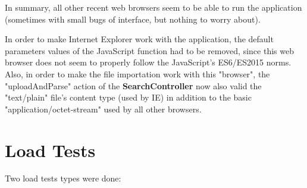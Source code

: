 \documentclass[a4paper,11pt]{report}
\begin{document}
In summary, all other recent web browsers seem to be able to run the application (sometimes with small bugs of interface, but nothing to worry about).
\newpage

In order to make Internet Explorer work with the application, the default parameters values of the JavaScript function had to be removed, since this web browser does not seem to properly follow the JavaScript's ES6/ES2015 norms. Also, in order to make the file importation work with this "browser", the "uploadAndParse" action of the \textbf{SearchController} now also valid the "text/plain" file's content type (used by IE) in addition to the basic "application/octet-stream" used by all other browsers.

\section{Load Tests}
Two load tests types were done:
\end{document}
